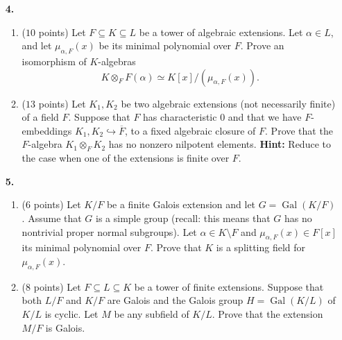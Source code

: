 \documentclass[12pt,
psamsfonts]{amsart}
\theoremstyle{remark}
\theoremstyle{definition}
\DeclareMathOperator{\Gal}{Gal}
\numberwithin{equation}{section}
\begin{document}
\begin{enumerate}
\item[\textbf{4.}] \begin{enumerate}
\item ($10$ points) Let $F\subseteq K\subseteq L$ be a tower of algebraic extensions. Let $\alpha\in L$, and let $\mu_{\alpha,F}(x)$ be its minimal polynomial over $F$. Prove an isomorphism of $K$-algebras \[K\otimes_F F(\alpha)\simeq K[x]/(\mu_{\alpha,F}(x)).\]
\item ($13$ points) Let $K_1, K_2$ be two algebraic extensions (not necessarily finite) of a field $F$. Suppose that $F$ has characteristic $0$ and that we have $F$-embeddings $K_1, K_2\hookrightarrow\overline{F}$, to a fixed algebraic closure of $F$. Prove that the $F$-algebra $K_1\otimes_F K_2$ has no nonzero nilpotent elements. \textbf{Hint:} Reduce to the case when one of the extensions is finite over $F$. \\
\end{enumerate}

\item[\textbf{5.}]
\begin{enumerate}
\item ($6$ points) Let $K/F$ be a finite Galois extension and let $G=\Gal(K/F)$. Assume that $G$ is a simple group (recall: this means that $G$ has no nontrivial proper normal subgroups). Let $\alpha\in K\setminus F$ and $\mu_{\alpha,F}(x)\in F[x]$ its minimal polynomial over $F$. Prove that $K$ is a splitting field for $\mu_{\alpha,F}(x)$. 
\item ($8$ points) Let $F\subseteq L\subseteq K$ be a tower of finite extensions. Suppose that both $L/F$ and $K/F$ are Galois and the Galois group $H=\Gal(K/L)$ of $K/L$ is cyclic. Let $M$ be any subfield of $K/L$. Prove that the extension $M/F$ is Galois. \\
\end{enumerate}


\end{enumerate}
\end{document}
